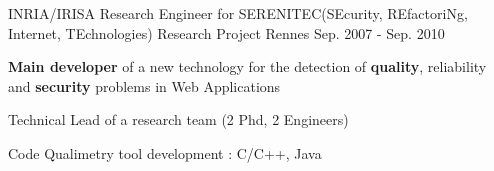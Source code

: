 \begin{cventries}
    \cventry
    {INRIA/IRISA} %
    {Research Engineer for SERENITEC(SEcurity, REfactoriNg, Internet, TEchnologies) Research Project} %
    {Rennes} %
    {Sep. 2007 - Sep. 2010} %
    {
        \begin{cvitems} %
            \item {\textbf{Main developer} of a new technology for the detection of \textbf{quality}, reliability and \textbf{security} problems in Web Applications}
            \item {Technical Lead of a research team (2 Phd, 2 Engineers)}
            \item {Code Qualimetry tool development : C/C++, Java}
        \end{cvitems}
    }


\end{cventries}
